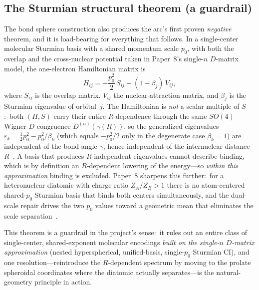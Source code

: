 \documentclass[aps,pra,twocolumn,superscriptaddress,longbibliography]{revtex4-2}
\begin{document}
\subsection{The Sturmian structural theorem (a guardrail)}

The bond sphere construction also produces the arc's first proven
\emph{negative} theorem, and it is load-bearing for everything that
follows.  In a single-center molecular Sturmian basis with a shared momentum scale
$p_0$, with both the overlap and the cross-nuclear potential taken in Paper~8's single-$n$ $D$-matrix model, the one-electron Hamiltonian matrix is
\begin{equation}
H_{ij} = -\frac{p_0^2}{2}\,S_{ij} + (1-\beta_j)\,V_{ij},
\label{eq:sturmian_structural}
\end{equation}
where $S_{ij}$ is the overlap matrix, $V_{ij}$ the nuclear-attraction
matrix, and $\beta_j$ is the Sturmian eigenvalue of orbital~$j$.  The
Hamiltonian is \emph{not} a scalar multiple of $S$:\ both $(H,S)$ carry
their entire $R$-dependence through the same $SO(4)$ Wigner-$D$
congruence $D^{(n)}(\gamma(R))$, so the generalized eigenvalues
$\varepsilon_k = \tfrac{1}{2}p_0^2 - p_0^2/\beta_k$ (which equals
$-p_0^2/2$ only in the degenerate case $\beta_k=1$) are independent of
the bond angle $\gamma$, hence independent of the internuclear
distance~$R$~\cite{loutey_paper8}.  A basis that produces
$R$-independent eigenvalues cannot describe binding, which is by
definition an $R$-dependent lowering of the energy---so \emph{within this
approximation} binding is excluded.  Paper~8 sharpens
this further:\ for a heteronuclear diatomic with charge ratio
$Z_A/Z_B > 1$ there is no atom-centered shared-$p_0$ Sturmian basis
that binds both centers simultaneously, and the dual-scale repair drives
the two $p_0$ values toward a geometric mean that eliminates the scale
separation~\cite{loutey_paper8}.

This theorem is a guardrail in the project's sense:\ it rules out an
entire class of single-center, shared-exponent molecular encodings
\emph{built on the single-$n$ $D$-matrix approximation} (nested
hyperspherical, unified-basis, single-$p_0$ Sturmian CI), and one
resolution---reintroduce the $R$-dependent spectrum by
moving to the prolate spheroidal coordinates where the diatomic
actually separates---is the natural-geometry principle in action.
\end{document}
